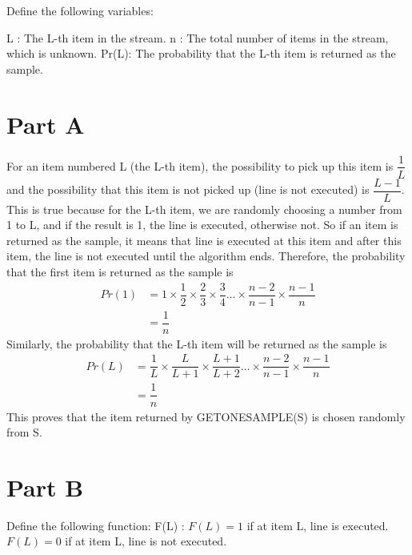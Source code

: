 \documentclass[11pt]{article}
\begin{document}

Define the following variables:

\noindent L :  The L-th item in the stream.\newline
\noindent n : The total number of items in the stream, which is unknown.\newline
\noindent Pr(L): The probability that the L-th item is returned as the sample.

\section{Part A}

\noindent For an item numbered L (the L-th item), the possibility to pick up this item is $\dfrac{1}{L}$ and the possibility that this item is not picked up (line is not executed) is $\dfrac{L-1}{L}$. This is true because for the L-th item, we are randomly choosing a number from 1 to L, and if the result is 1, the line is executed, otherwise not. So if an item is returned as the sample, it means that  line is executed at this item and after this item, the line is not executed until the algorithm ends. \newline
\noindent Therefore, the probability that the first item is returned as the sample is 
\begin{align*}
Pr(1)
&=1\times\dfrac{1}{2}\times\dfrac{2}{3}\times\dfrac{3}{4}\ldots\times\dfrac{n-2}{n-1}\times\dfrac{n-1}{n}\\
&=\dfrac{1}{n}
\end{align*}
Similarly, the probability that the L-th item will be returned as the sample is 
\begin{align*}
Pr(L)
&=\dfrac{1}{L}\times\dfrac{L}{L+1}\times\dfrac{L+1}{L+2}\ldots\times\dfrac{n-2}{n-1}\times\dfrac{n-1}{n}\\
&=\dfrac{1}{n}
\end{align*}
This proves that the item returned by GETONESAMPLE(S) is chosen randomly from S.


\section{Part B}
Define the following function:\newline
\noindent F(L) : $F(L)=1$ if at item L, line is executed. $F(L)=0$ if at item L, line is not executed.
\end{document}
